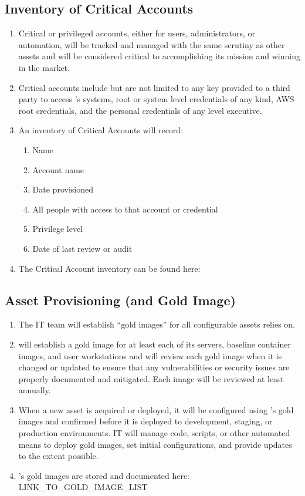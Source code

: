 \documentclass[../main.tex]{subfiles}
\begin{document}
\subsection{Inventory of Critical Accounts}
\begin{enumerate}
    \item Critical or privileged accounts, either for users, administrators, or automation, will be tracked and managed with the same scrutiny as other assets and will be considered
    critical to \CompanyName{} accomplishing its mission and winning in the market.
    \item Critical accounts include but are not limited to any key provided to a third party to access \CompanyName's systems, root or system level credentials of any kind,
    AWS root credentials, and the personal credentials of any \CompanyName{} level executive.
    \item An inventory of Critical Accounts will record:
    \begin{enumerate}
        \item Name
        \item Account name
        \item Date provisioned
        \item All people with access to that account or credential
        \item Privilege level
        \item Date of last review or audit
    \end{enumerate}
    \item The Critical Account inventory can be found here: \AssetInventory
\end{enumerate}

\subsection{Asset Provisioning (and Gold Image)}
\begin{enumerate}
    \item The IT team will establish “gold images” for all configurable assets \CompanyName{} relies on.
    \item \CompanyName{} will establish a gold image for at least each of its servers, baseline container images, and user workstations and will review each gold image when it is changed
    or updated to ensure that any vulnerabilities or security issues are properly documented and mitigated. Each image will be reviewed at least annually.
    \item When a new asset is acquired or deployed, it will be configured using \CompanyName's gold images and confirmed before it is deployed to development, staging, or production environments.
    IT will manage code, scripts, or other automated means to deploy gold images, set initial configurations, and provide updates to the extent possible.
    \item \CompanyName's gold images are stored and documented here: LINK\_TO\_GOLD\_IMAGE\_LIST
\end{enumerate}
\end{document}
